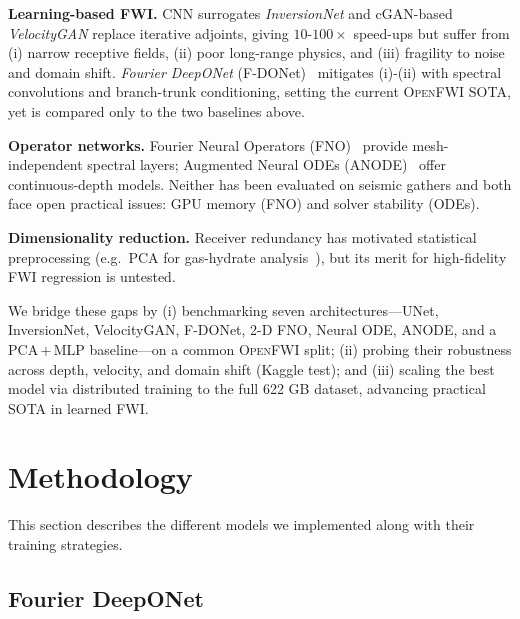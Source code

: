 \documentclass{article}
\newcommand{\instructions}[1]{{\color{blue} #1}}
\begin{document}
\textbf{Learning-based FWI.}  
CNN surrogates \textit{InversionNet} and cGAN-based \textit{VelocityGAN}
replace iterative adjoints, giving $10$-$100\times$ speed-ups but suffer from
(i) narrow receptive fields, (ii) poor long-range physics, and (iii) fragility
to noise and domain shift.  
\textit{Fourier DeepONet} (F-DONet)~\cite{fdonet} mitigates (i)-(ii) with
spectral convolutions and branch-trunk conditioning, setting the current
\textsc{OpenFWI} SOTA, yet is compared only to the two baselines above.

\textbf{Operator networks.}
Fourier Neural Operators (FNO)~\cite{fno} provide mesh-independent spectral
layers; Augmented Neural ODEs (ANODE)~\cite{anode} offer continuous-depth
models.  Neither has been evaluated on seismic gathers and both face open
practical issues: GPU memory (FNO) and solver stability (ODEs).

\textbf{Dimensionality reduction.}
Receiver redundancy has motivated statistical preprocessing
(e.g.\ PCA for gas-hydrate analysis~\cite{jones2023waveform}), but its merit
for high-fidelity FWI regression is untested.

We bridge these gaps by (i) benchmarking seven architectures—UNet,
InversionNet, VelocityGAN, F-DONet, \mbox{2-D} FNO, Neural ODE, ANODE, and a
PCA\,+\,MLP baseline—on a common \textsc{OpenFWI} split; (ii) probing their
robustness across depth, velocity, and domain shift (Kaggle test); and
(iii) scaling the best model via distributed training to the full 622 GB
dataset, advancing practical SOTA in learned FWI.

\section{Methodology}

This section describes the different models we implemented along with their training strategies.

\subsection{Fourier DeepONet}
\end{document}
